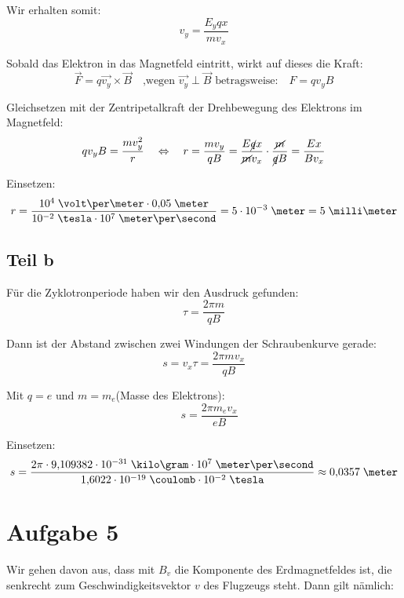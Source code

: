 \documentclass[a4paper,german,12pt,smallheadings]{scrartcl}
\begin{document}
Wir erhalten somit:
\begin{equation*}
v_y=\frac{E_yqx}{mv_x}
\end{equation*}

Sobald das Elektron in das Magnetfeld eintritt, wirkt auf dieses die Kraft:
\begin{equation*}
\vec{F}=q\vec{v_y} \times \vec{B} \quad \text{,wegen $\vec{v_y} \perp \vec{B}$ betragsweise:} \quad F=qv_yB
\end{equation*}

Gleichsetzen mit der Zentripetalkraft der Drehbewegung des Elektrons im Magnetfeld:
\begin{equation*}
qv_yB=\frac{mv_y^2}{r} \quad \Leftrightarrow \quad r=\frac{m v_y}{qB}=\frac{E\cancel{q}x}{\cancel{m}v_x} \cdot \frac{\cancel{m}}{\cancel{q}B}=\frac{Ex}{Bv_x}
\end{equation*}

Einsetzen:
\begin{align*}
r=\frac{10^4\;\volt\per\meter \cdot 0{,}05\;\meter}{10^{-2}\;\tesla \cdot 10^7\;\meter\per\second} = 5 \cdot 10^{-3}\;\meter = 5 \;\milli\meter
\end{align*}

\subsection*{Teil b}
Für die Zyklotronperiode haben wir den Ausdruck gefunden:
\begin{equation*}
\tau=\frac{2\pi m}{qB}
\end{equation*}

Dann ist der Abstand zwischen zwei Windungen der Schraubenkurve gerade:
\begin{equation*}
s=v_x\tau = \frac{2 \pi m v_x}{qB}
\end{equation*}

Mit $q=e$ und $m=m_e$(Masse des Elektrons):
\begin{equation*}
\quad s=\frac{2 \pi m_e v_x}{eB}
\end{equation*}

Einsetzen:
\begin{equation*}
s=\frac{2\pi \cdot 9{,}109382\cdot 10^{-31}\;\kilo\gram \cdot 10^7\; \meter\per\second}{1{,}6022 \cdot 10^{-19} \;\coulomb \cdot 10^{-2}\;\tesla} \approx 0{,}0357\;\meter
\end{equation*}

\section*{Aufgabe 5}
Wir gehen davon aus, dass mit $B_v$ die Komponente des Erdmagnetfeldes ist, die
senkrecht zum Geschwindigkeitsvektor $v$ des Flugzeugs steht. Dann gilt
nämlich:
\end{document}
